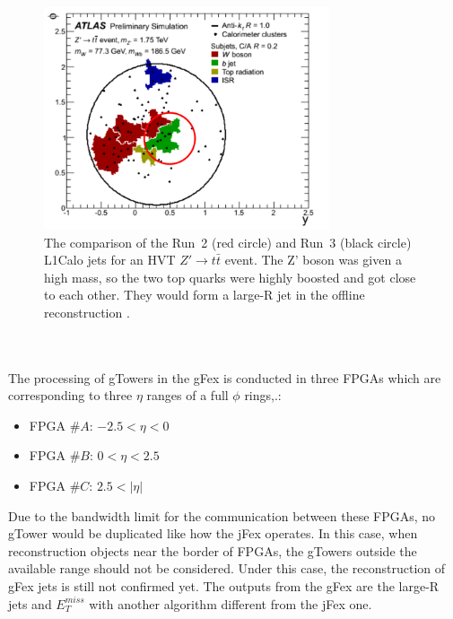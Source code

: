 \begin{figure}[!h]                
	\includegraphics[width=0.75\textwidth]{Chapter6/TrigJetRange.png}
	\begin{center}
		\caption{The comparison of the Run~2 (red circle) and Run~3 (black circle) L1Calo jets for an HVT $Z'\to t\bar{t}$ event. The Z' boson was given a high mass, so the two top quarks were highly boosted and got close to each other. They would form a large-R jet in the offline reconstruction \cite{Tang:2289434}.  }
		\label{Fig:ZPrimett}            
	\end{center}
\end{figure}
\noindent
\\
\\The processing of gTowers in the gFex is conducted in three FPGAs which are corresponding to three $\eta$ ranges of a full $\phi$ rings,.:
\begin{itemize}
	\item FPGA $\#A$: $-2.5<\eta<0$
	\item FPGA $\#B$: $0<\eta<2.5$
	\item FPGA $\#C$: $2.5<|\eta|$
\end{itemize}
Due to the bandwidth limit for the communication between these FPGAs, no gTower would be duplicated like how the jFex operates. In this case, when reconstruction objects near the border of FPGAs, the gTowers outside the available range should not be considered. Under this case, the reconstruction of gFex jets is still not confirmed yet. The outputs from the gFex are the large-R jets and $E^{miss}_{T}$ with another algorithm different from the jFex one.
